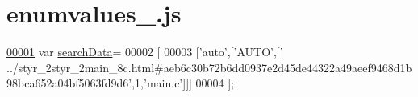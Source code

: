 \hypertarget{enumvalues__0_8js_source}{}\section{enumvalues\+\_.\+js}
\label{enumvalues__0_8js_source}

\begin{DoxyCode}
\hypertarget{enumvalues__0_8js_source.tex_l00001}{}\hyperlink{enumvalues__0_8js_ad01a7523f103d6242ef9b0451861231e}{00001} var \hyperlink{enumvalues__0_8js_ad01a7523f103d6242ef9b0451861231e}{searchData}=
00002 [
00003   [\textcolor{stringliteral}{'auto'},[\textcolor{stringliteral}{'AUTO'},[\textcolor{stringliteral}{'
      ../styr\_2styr\_2main\_8c.html#aeb6c30b72b6dd0937e2d45de44322a49aeef9468d1b98bca652a04bf5063fd9d6'},1,\textcolor{stringliteral}{'main.c'}]]]
00004 ];
\end{DoxyCode}
